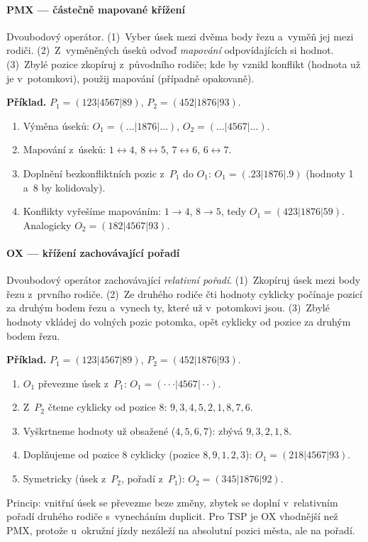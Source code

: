 \documentclass[11pt,a4paper]{article}
\theoremstyle{definition}
\begin{document}
\paragraph{PMX --- částečně mapované křížení}

\begin{defbox}
Dvoubodový operátor. (1)~Vyber úsek mezi dvěma body řezu a~vyměň jej mezi
rodiči. (2)~Z~vyměněných úseků odvoď \emph{mapování} odpovídajících si hodnot.
(3)~Zbylé pozice zkopíruj z~původního rodiče; kde by vznikl konflikt (hodnota už
je v~potomkovi), použij mapování (případně opakovaně).
\end{defbox}

\textbf{Příklad.} $P_1 = (123|4567|89)$, $P_2 = (452|1876|93)$.
\begin{enumerate}
\item Výměna úseků: $O_1 = (\ldots|1876|\ldots)$, $O_2 = (\ldots|4567|\ldots)$.
\item Mapování z~úseků: $1{\leftrightarrow}4$, $8{\leftrightarrow}5$,
  $7{\leftrightarrow}6$, $6{\leftrightarrow}7$.
\item Doplnění bezkonfliktních pozic z~$P_1$ do $O_1$:
  $O_1 = (.23|1876|.9)$ (hodnoty 1 a~8 by kolidovaly).
\item Konflikty vyřešíme mapováním: $1 \to 4$, $8 \to 5$, tedy
  $O_1 = (423|1876|59)$. Analogicky $O_2 = (182|4567|93)$.
\end{enumerate}

\paragraph{OX --- křížení zachovávající pořadí}

\begin{defbox}
Dvoubodový operátor zachovávající \emph{relativní pořadí}. (1)~Zkopíruj úsek
mezi body řezu z~prvního rodiče. (2)~Ze druhého rodiče čti hodnoty cyklicky
počínaje pozicí za druhým bodem řezu a~vynech ty, které už v~potomkovi jsou.
(3)~Zbylé hodnoty vkládej do volných pozic potomka, opět cyklicky od pozice
za druhým bodem řezu.
\end{defbox}

\textbf{Příklad.} $P_1 = (123|4567|89)$, $P_2 = (452|1876|93)$.
\begin{enumerate}
\item $O_1$ převezme úsek z~$P_1$: $O_1 = ({\cdot}{\cdot}{\cdot}|4567|{\cdot}{\cdot})$.
\item Z~$P_2$ čteme cyklicky od pozice 8: $9,3,4,5,2,1,8,7,6$.
\item Vyškrtneme hodnoty už obsažené ($4,5,6,7$): zbývá $9,3,2,1,8$.
\item Doplňujeme od pozice 8 cyklicky (pozice $8,9,1,2,3$):
  $O_1 = (218|4567|93)$.
\item Symetricky (úsek z~$P_2$, pořadí z~$P_1$): $O_2 = (345|1876|92)$.
\end{enumerate}
Princip: vnitřní úsek se převezme beze změny, zbytek se doplní v~relativním
pořadí druhého rodiče s~vynecháním duplicit. Pro TSP je OX vhodnější než PMX,
protože u~okružní jízdy nezáleží na absolutní pozici města, ale na pořadí.
\end{document}
